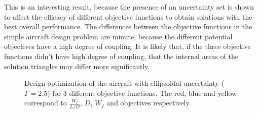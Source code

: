 This is an interesting result, because the presence of an uncertainty set is shown to affect the efficacy of different objective functions to obtain solutions with the best overall performance. The differences between the objective functions in the simple aircraft design problem are minute, because the different potential objectives have a high degree of coupling. It is likely that, if the three objective functions didn't have high degree of coupling, that the internal areas of the solution triangles may differ more significantly.

\begin{figure}[H]
\caption{Design optimization of the aircraft with ellipsoidal uncertainty ($\Gamma = 2.5$) for 3 different objective functions. The red, blue and yellow correspond to $\frac{W_f}{L/D}$, $D$, $W_f$ and objectives respectively.}
\begin{center}
\end{center}
\end{figure}